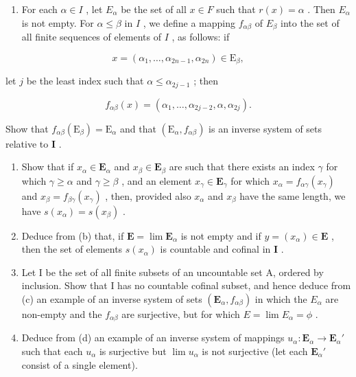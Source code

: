 \begin{enumerate}
\def\labelenumi{(\alph{enumi})}
\tightlist
\item
  For each \(\alpha \in I\) , let \(E_{\alpha}\) be the set of all \(x \in F\) such that \(r(x) = \alpha\) . Then \(E_{\alpha}\) is not empty. For \(\alpha \leqslant \beta\) in \(I\) , we define a mapping \(f_{\alpha \beta}\) of \(E_{\beta}\) into the set of all finite sequences of elements of \(I\) , as follows: if
\end{enumerate}

\[
x = \left(\alpha_ {1}, \dots , \alpha_ {2 n - 1}, \alpha_ {2 n}\right) \in \mathrm{E} _ {\beta},
\]

let \(j\) be the least index such that \(\alpha \leqslant \alpha_{2j - 1}\) ; then

\[
f _ {\alpha \beta} (x) = (\alpha_ {1}, \dots , \alpha_ {2 j - 2}, \alpha , \alpha_ {2 j}).
\]

Show that \(f_{\alpha \beta}(\mathrm{E}_{\beta}) = \mathrm{E}_{\alpha}\) and that \((\mathrm{E}_{\alpha}, f_{\alpha \beta})\) is an inverse system of sets relative to \(\mathbf{I}\) .

\begin{enumerate}
\def\labelenumi{(\alph{enumi})}
\setcounter{enumi}{1}
\item
  Show that if \(x_{\alpha} \in \mathbf{E}_{\alpha}\) and \(x_{\beta} \in \mathbf{E}_{\beta}\) are such that there exists an index \(\gamma\) for which \(\gamma \geqslant \alpha\) and \(\gamma \geqslant \beta\) , and an element \(x_{\gamma} \in \mathbf{E}_{\gamma}\) for which \(x_{\alpha} = f_{\alpha \gamma}(x_{\gamma})\) and \(x_{\beta} = f_{\beta \gamma}(x_{\gamma})\) , then, provided also \(x_{\alpha}\) and \(x_{\beta}\) have the same length, we have \(s(x_{\alpha}) = s(x_{\beta})\) .
\item
  Deduce from (b) that, if \(\mathbf{E} = \lim \mathbf{E}_{\alpha}\) is not empty and if \(y = (x_{\alpha}) \in \mathbf{E}\) , then the set of elements \(s(x_{\alpha})\) is countable and cofinal in \(\mathbf{I}\) .
\item
  Let I be the set of all finite subsets of an uncountable set A, ordered by inclusion. Show that I has no countable cofinal subset, and hence deduce from (c) an example of an inverse system of sets \((\mathbf{E}_{\alpha}, f_{\alpha\beta})\) in which the \(E_{\alpha}\) are non-empty and the \(f_{\alpha\beta}\) are surjective, but for which \(E = \lim E_{\alpha} = \phi\) .
\item
  Deduce from (d) an example of an inverse system of mappings \(u_{\alpha}: \mathbf{E}_{\alpha} \to \mathbf{E}_{\alpha}'\) such that each \(u_{\alpha}\) is surjective but \(\lim u_{\alpha}\) is not surjective (let each \(\mathbf{E}_{\alpha}'\) consist of a single element).
\end{enumerate}

